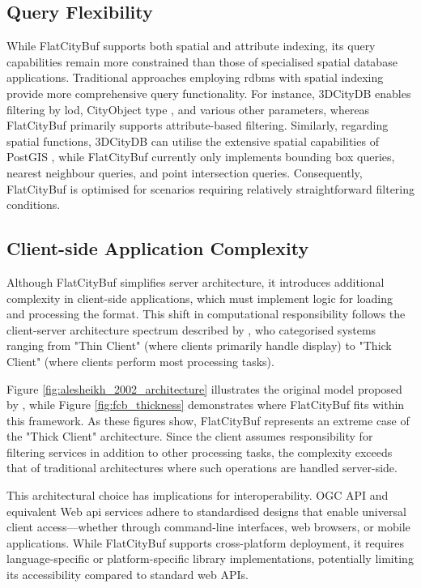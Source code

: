 \subsection{Query Flexibility}
\label{flexibility_of_query}

While FlatCityBuf supports both spatial and attribute indexing, its query capabilities remain more constrained than those of specialised spatial database applications. Traditional approaches employing \ac{rdbms} with spatial indexing provide more comprehensive query functionality. For instance, 3DCityDB enables filtering by \ac{lod}, CityObject type \citep{3dcitydb}, and various other parameters, whereas FlatCityBuf primarily supports attribute-based filtering. Similarly, regarding spatial functions, 3DCityDB can utilise the extensive spatial capabilities of PostGIS \citep{postgis}, while FlatCityBuf currently only implements bounding box queries, nearest neighbour queries, and point intersection queries. Consequently, FlatCityBuf is optimised for scenarios requiring relatively straightforward filtering conditions.

\subsection{Client-side Application Complexity}
\label{complexity_of_client_side_application}

Although FlatCityBuf simplifies server architecture, it introduces additional complexity in client-side applications, which must implement logic for loading and processing the format. This shift in computational responsibility follows the client-server architecture spectrum described by \citet{alesheikh_2002}, who categorised systems ranging from "Thin Client" (where clients primarily handle display) to "Thick Client" (where clients perform most processing tasks).

Figure \ref{fig:alesheikh_2002_architecture} illustrates the original model proposed by \citet{alesheikh_2002}, while Figure \ref{fig:fcb_thickness} demonstrates where FlatCityBuf fits within this framework. As these figures show, FlatCityBuf represents an extreme case of the "Thick Client" architecture. Since the client assumes responsibility for filtering services in addition to other processing tasks, the complexity exceeds that of traditional architectures where such operations are handled server-side.

This architectural choice has implications for interoperability. OGC API \citep{ogc_api} and equivalent Web \ac{api} services adhere to standardised designs that enable universal client access—whether through command-line interfaces, web browsers, or mobile applications. While FlatCityBuf supports cross-platform deployment, it requires language-specific or platform-specific library implementations, potentially limiting its accessibility compared to standard web APIs.


